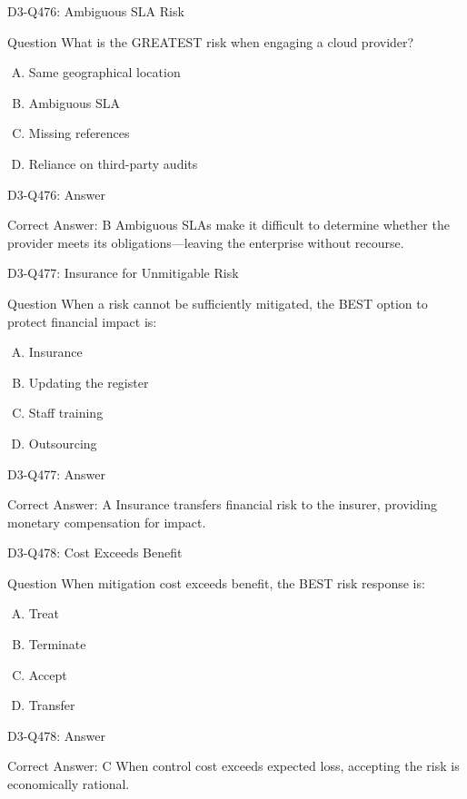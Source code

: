 \documentclass{beamer}
\begin{document}
\begin{frame}{D3-Q476: Ambiguous SLA Risk}
	\begin{block}{Question}
		What is the GREATEST risk when engaging a cloud provider?
	\end{block}
	\begin{enumerate}[(A)]
		\item Same geographical location
		\item Ambiguous SLA
		\item Missing references
		\item Reliance on third-party audits
	\end{enumerate}
\end{frame}
\begin{frame}{D3-Q476: Answer}
	\begin{block}{Correct Answer: B}
		Ambiguous SLAs make it difficult to determine whether the provider meets its obligations—leaving the enterprise without recourse.
	\end{block}
\end{frame}

\begin{frame}{D3-Q477: Insurance for Unmitigable Risk}
	\begin{block}{Question}
		When a risk cannot be sufficiently mitigated, the BEST option to protect financial impact is:
	\end{block}
	\begin{enumerate}[(A)]
		\item Insurance
		\item Updating the register
		\item Staff training
		\item Outsourcing
	\end{enumerate}
\end{frame}
\begin{frame}{D3-Q477: Answer}
	\begin{block}{Correct Answer: A}
		Insurance transfers financial risk to the insurer, providing monetary compensation for impact.
	\end{block}
\end{frame}

\begin{frame}{D3-Q478: Cost Exceeds Benefit}
	\begin{block}{Question}
		When mitigation cost exceeds benefit, the BEST risk response is:
	\end{block}
	\begin{enumerate}[(A)]
		\item Treat
		\item Terminate
		\item Accept
		\item Transfer
	\end{enumerate}
\end{frame}
\begin{frame}{D3-Q478: Answer}
	\begin{block}{Correct Answer: C}
		When control cost exceeds expected loss, accepting the risk is economically rational.
	\end{block}
\end{frame}
\end{document}
